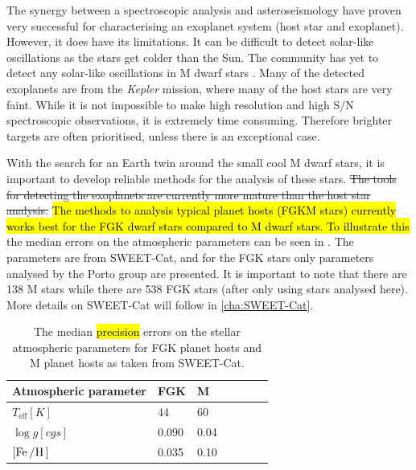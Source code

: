 The synergy between a spectroscopic analysis and asteroseismology have proven very successful
\citep[see e.g.][]{Huber2013} for characterising an exoplanet system (host star and exoplanet).
However, it does have its limitations. It can be difficult to detect solar-like oscillations as the
stars get colder than the Sun. The community has yet to detect any solar-like oscillations in M
dwarf stars \citep{Rodriguez2016,Berdinas2017}. Many of the detected exoplanets are from the
\emph{Kepler} mission, where many of the host stars are very faint. While it is not impossible to
make high resolution and high S/N spectroscopic observations, it is extremely time consuming.
Therefore brighter targets are often prioritised, unless there is an exceptional case.

With the search for an Earth twin around the small cool M dwarf stars, it is important to develop
reliable methods for the analysis of these stars. \st{The tools for detecting the exoplanets are
currently more mature than the host star analysis.} \hl{ The methods to analysis typical planet
hosts (FGKM stars) currently works best for the FGK dwarf stars compared to M dwarf stars. To
illustrate this} the median errors on the atmospheric parameters can be seen in
. The parameters are from SWEET-Cat, and for the FGK stars only parameters
analysed by the Porto group are presented. It is important to note that there are 138 M stars while
there are 538 FGK stars (after only using stars analysed here). More details on SWEET-Cat will
follow in \cref{cha:SWEET-Cat}.
\begin{table}[htb!]
    \caption{The median \hl{precision} errors on the stellar atmospheric parameters for FGK planet
             hosts and M planet hosts as taken from SWEET-Cat.}
    \label{tab:standardErrors}
    \centering
    \begin{tabular}{lllllll}
      \hline\hline
        Atmospheric parameter      & FGK    & M    \\
      \hline
        $T_\mathrm{eff} [\si{K}]$  & 44     & 60   \\
        $\log g [\si{cgs}]$        & 0.090  & 0.04 \\
        $[\ion{Fe}/\ion{H}]$       & 0.035  & 0.10 \\
      \hline
    \end{tabular}
\end{table}

